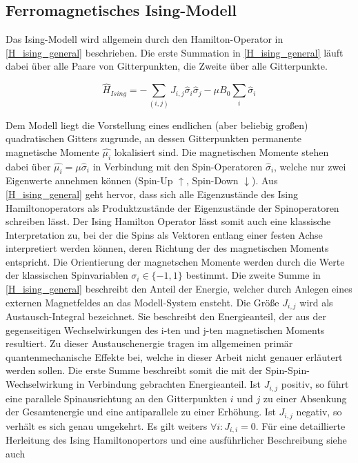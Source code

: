 \subsection{Ferromagnetisches Ising-Modell} \label{sec: Ferromagnetisches Ising-Modell}

Das Ising-Modell wird allgemein durch den Hamilton-Operator in \eqref{H_ising_general} beschrieben. Die erste Summation in \eqref{H_ising_general}  läuft dabei über alle Paare von Gitterpunkten, die Zweite über alle Gitterpunkte. 

\begin{equation} \label{H_ising_general}
\hat{H}_{Ising} = - \sum_{(i,j)} J_{i,j} \hat{\sigma}_i \hat{\sigma}_j - \mu B_0 \sum_{i} \hat{\sigma}_i 
\end{equation}

\noindent Dem Modell liegt die Vorstellung eines endlichen (aber beliebig großen) quadratischen Gitters zugrunde, an dessen Gitterpunkten permanente magnetische Momente $\hat{\mu_i}$ lokalisiert sind. Die magnetischen Momente stehen dabei über $\hat{\mu_i} = \mu \hat{\sigma}_i$ in Verbindung mit den Spin-Operatoren $\hat{\sigma}_i$, welche nur zwei Eigenwerte annehmen können (Spin-Up $\uparrow$, Spin-Down $\downarrow$). Aus \eqref{H_ising_general} geht hervor, dass sich alle Eigenzustände des Ising Hamiltonoperators als Produktzustände der Eigenzustände der Spinoperatoren schreiben lässt. 
Der Ising Hamilton Operator lässt somit auch eine klassische Interpretation zu, bei der die Spins als Vektoren entlang einer festen Achse interpretiert werden können, deren Richtung der des magnetischen Moments entspricht. Die Orientierung der magnetschen Momente werden durch die Werte der klassischen Spinvariablen $ \sigma_i \in \{ -1, 1 \}$ bestimmt. Die zweite Summe in \eqref{H_ising_general} beschreibt den Anteil der Energie, welcher durch Anlegen eines externen Magnetfeldes an das Modell-System ensteht.
Die Größe $J_{i,j}$ wird als Austausch-Integral bezeichnet. Sie beschreibt den Energieanteil, der aus der gegenseitigen Wechselwirkungen des i-ten und j-ten magnetischen Moments resultiert. Zu dieser Austauschenergie tragen im allgemeinen primär quantenmechanische Effekte bei, welche in dieser Arbeit nicht genauer erläutert werden sollen. Die erste Summe beschreibt somit die mit der Spin-Spin-Wechselwirkung in Verbindung gebrachten Energieanteil. Ist $J_{i,j}$ positiv, so führt eine parallele Spinausrichtung an den Gitterpunkten $i$ und $j$ zu einer Absenkung der Gesamtenergie und eine antiparallele zu einer Erhöhung. Ist $J_{i,j}$ negativ, so verhält es sich genau umgekehrt. Es gilt weiters $\forall i : J_{i,i} = 0$. Für eine detaillierte Herleitung des Ising Hamiltonopertors und eine ausführlicher Beschreibung siehe auch \\


